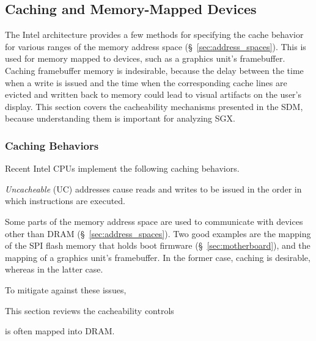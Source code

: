 \subsection{Caching and Memory-Mapped Devices}
\label{sec:memory_io}

The Intel architecture provides a few methods for specifying the cache behavior
for various ranges of the memory address space (\S~\ref{sec:address_spaces}).
This is used for memory mapped to devices, such as a graphics unit's
framebuffer. Caching framebuffer memory is indesirable, because the delay
between the time when a write is issued and the time when the corresponding
cache lines are evicted and written back to memory could lead to visual
artifacts on the user's display. This section covers the cacheability
mechanisms presented in the SDM, because understanding them is important for
analyzing SGX.


\subsubsection{Caching Behaviors}

Recent Intel CPUs implement the following caching behaviors.

\textit{Uncacheable} (UC) addresses cause reads and writes to be issued in the
order in which instructions are executed.


Some parts of the memory address space are used to communicate with devices
other than DRAM (\S~\ref{sec:address_spaces}). Two good examples are the
mapping of the SPI flash memory that holds boot firmware
(\S~\ref{sec:motherboard}), and the mapping of a graphics unit's framebuffer.
In the former case, caching is desirable, whereas in the latter case.

To mitigate against these issues,


This section reviews the cacheability controls

is often mapped
into DRAM.
